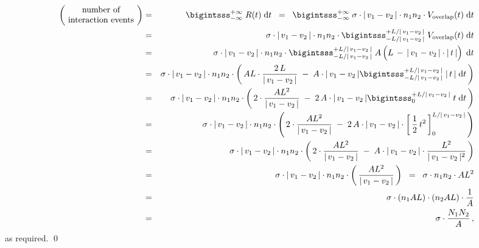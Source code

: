\begin{eqnarray*}
\left(\!\begin{array}{c}
    \textnormal{number of}
    \\
    \textnormal{interaction events}
    \end{array}\!\right)
& = &
    \bigintsss_{-\infty}^{+\infty}\;
        R(t)
        \;\d t
\;\; = \;\;
    \bigintsss_{-\infty}^{+\infty}\;
        \sigma \cdot \vert\,v_{1} - v_{2}\,\vert \cdot n_{1} n_{2} \cdot V_{\textnormal{overlap}}(t)
        \;\d t
\\
& = &
    \sigma \cdot \vert\,v_{1} - v_{2}\,\vert \cdot n_{1} n_{2} \cdot
    \bigintsss_{-L/\vert\,v_{1}-v_{2}\,\vert}^{+L/\vert\,v_{1}-v_{2}\,\vert}\;
        V_{\textnormal{overlap}}(t)
        \;\d t
\\
& = &
    \sigma \cdot \vert\,v_{1} - v_{2}\,\vert \cdot n_{1} n_{2} \cdot
    \bigintsss_{-L/\vert\,v_{1}-v_{2}\,\vert}^{+L/\vert\,v_{1}-v_{2}\,\vert}\;
         A\left(L \,\overset{{\color{white}.}}{-}\, \vert\,v_{1}-v_{2}\,\vert\cdot\vert\,t\,\vert\right)
        \;\d t
\\
& = &
    \sigma \cdot \vert\,v_{1} - v_{2}\,\vert \cdot n_{1} n_{2} \cdot
    \left(\,
	    AL \cdot \dfrac{2\,L}{\vert\,v_{1}-v_{2}\,\vert}
	    \; - \;
	    A \cdot \vert\,v_{1}-v_{2}\,\vert
	    \bigintsss_{-L/\vert\,v_{1}-v_{2}\,\vert}^{+L/\vert\,v_{1}-v_{2}\,\vert}\;
	        \vert\,t\,\vert
	        \;\d t
	    \,\right)
\\
& = &
    \sigma \cdot \vert\,v_{1} - v_{2}\,\vert \cdot n_{1} n_{2} \cdot
    \left(\,
	    2\cdot\dfrac{AL^{2}}{\vert\,v_{1}-v_{2}\,\vert}
	    \; - \;
	    2\,A \cdot \vert\,v_{1}-v_{2}\,\vert
	    \bigintsss_{0}^{+L/\vert\,v_{1}-v_{2}\,\vert}\;
	        t
	        \;\d t
	    \,\right)
\\
& = &
    \sigma \cdot \vert\,v_{1} - v_{2}\,\vert \cdot n_{1} n_{2} \cdot
    \left(\,
	    2\cdot\dfrac{AL^{2}}{\vert\,v_{1}-v_{2}\,\vert}
	    \; - \;
	    2\,A \cdot \vert\,v_{1}-v_{2}\,\vert \cdot
	    \left[\,
	        \dfrac{1}{2}\,t^{2}
	        \,\right]_{0}^{L/\vert\,v_{1}-v_{2}\,\vert}
	    \,\right)
\\
& = &
    \sigma \cdot \vert\,v_{1} - v_{2}\,\vert \cdot n_{1} n_{2} \cdot
    \left(\,
	    2\cdot\dfrac{AL^{2}}{\vert\,v_{1}-v_{2}\,\vert}
	    \; - \;
	    A \cdot \vert\,v_{1}-v_{2}\,\vert \cdot
	    \dfrac{L^{2}}{\vert\,v_{1}-v_{2}\,\vert^{2}}
	    \,\right)
\\
& = &
    \sigma \cdot \vert\,v_{1} - v_{2}\,\vert \cdot n_{1} n_{2} \cdot
    \left(\,
        \dfrac{AL^{2}}{\vert\,v_{1}-v_{2}\,\vert}
	    \,\right)
\;\; = \;\;
    \sigma \cdot n_{1} n_{2} \cdot AL^{2}
\\
& = &
    \sigma \cdot \left(n_{1} A L\right) \cdot \left(n_{2} A L\right) \cdot \dfrac{1}{A}
\\
& = &
    \sigma \cdot \dfrac{ N_{1} N_{2} }{A}\,,
\end{eqnarray*}
as required.
\qed

